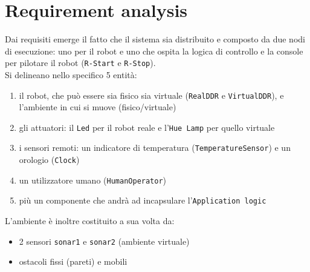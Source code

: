 \documentclass{../llncs}
\newcommand{\code}[1]{{\color{blue}\small{\texttt{#1}}}}
\newcommand{\labelsec}[1]{\label{sec:#1}}
\begin{document}
%

\section{Requirement analysis}
\labelsec{ReqAnalysis}

Dai requisiti emerge il fatto che il sistema sia distribuito e composto da due nodi di esecuzione: uno per il robot e uno che ospita la logica di controllo e la console per pilotare il robot (\code{R-Start} e \code{R-Stop}).\\

\noindent Si delineano nello specifico 5 entità:
\begin{enumerate}
\item il robot, che può essere sia fisico sia virtuale (\texttt{RealDDR} e \texttt{VirtualDDR}), e l'ambiente in cui si muove (fisico/virtuale)
\item gli attuatori: il \texttt{Led} per il robot reale e l'\texttt{Hue Lamp} per quello virtuale
\item i sensori remoti: un indicatore di temperatura (\texttt{TemperatureSensor}) e un orologio (\texttt{Clock})
\item un utilizzatore umano (\texttt{HumanOperator})
\item più un componente che andrà ad incapsulare l'\texttt{Application logic}
\end{enumerate}

\noindent L'ambiente è inoltre costituito a sua volta da:
\begin{itemize}[label={--}]
\item 2 sensori \code{sonar1} e \code{sonar2} (ambiente virtuale)
\item ostacoli fissi (pareti) e mobili
\end{itemize}
\end{document}
